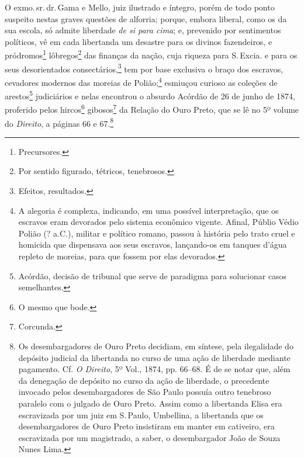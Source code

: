 O exmo.\,sr.\,dr.\,Gama e Mello, juiz ilustrado e íntegro, porém de todo
ponto suspeito nestas graves questões de alforria; porque, embora
liberal, como os da sua escola, só admite liberdade \emph{de si para
cima}; e, prevenido por sentimentos políticos, vê em cada libertanda um
desastre para os divinos fazendeiros, e pródromos\footnote{
  Precursores.} lôbregos\footnote{Por sentido figurado, tétricos,
  tenebrosos.} das finanças da nação, cuja riqueza para S.\,Excia. e para
os seus desorientados consectários,\footnote{Efeitos, resultados.} tem
por base exclusiva o braço dos escravos, cevadores modernos das moreias
de Polião;\footnote{A alegoria é complexa, indicando, em uma possível
  interpretação, que os escravos eram devorados pelo sistema econômico vigente.
  Afinal, Públio Védio Polião (? a.C.), militar e político romano,
  passou à história pelo trato cruel e homicida que dispensava aos seus
  escravos, lançando-os em tanques d'água repleto de moreias, para que
  fossem por elas devorados.} esmiuçou curioso as coleções de
arestos\footnote{Acórdão, decisão de tribunal que serve de paradigma
  para solucionar casos semelhantes.} judiciários e nelas encontrou o
absurdo Acórdão de 26 de junho de 1874, proferido pelos hircos\footnote{
  O mesmo que bode.} gibosos\footnote{Corcunda.} da Relação do Ouro
Preto, que se lê no 5º volume do \emph{Direito}, a páginas 66 e
67.\footnote{Os desembargadores de Ouro Preto decidiam, em síntese,
  pela ilegalidade do depósito judicial da libertanda no curso de uma
  ação de liberdade mediante pagamento. Cf. \emph{O Direito}, 5º Vol.,
  1874, pp. 66--68. É de se notar que, além da denegação de depósito no
  curso da ação de liberdade, o precedente invocado pelos
  desembargadores de São Paulo possuía outro tenebroso paralelo com o
  julgado de Ouro Preto. Assim como a libertanda Elisa era escravizada
  por um juiz em S.\,Paulo, Umbellina, a libertanda que os
  desembargadores de Ouro Preto insistiram em manter em cativeiro, era
  escravizada por um magistrado, a saber, o desembargador João de Souza
  Nunes Lima.}

